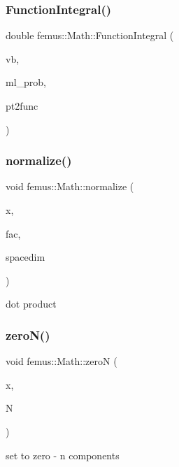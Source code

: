 \subsubsection{\texorpdfstring{Function\+Integral()}{FunctionIntegral()}}
{\footnotesize\ttfamily double femus\+::\+Math\+::\+Function\+Integral (\begin{DoxyParamCaption}\item[{const \mbox{\hyperlink{_typedefs_8hpp_a91ad9478d81a7aaf2593e8d9c3d06a14}{uint}}}]{vb,  }\item[{\mbox{\hyperlink{classfemus_1_1_multi_level_problem}{Multi\+Level\+Problem}} \&}]{ml\+\_\+prob,  }\item[{double($\ast$)(double, const std\+::vector$<$ double $>$)}]{pt2func }\end{DoxyParamCaption})\hspace{0.3cm}{\ttfamily [inline]}}

\mbox{\label{namespacefemus_1_1_math_a3c615988fe381fae399525c16a2941c5}} 
\subsubsection{\texorpdfstring{normalize()}{normalize()}}
{\footnotesize\ttfamily void femus\+::\+Math\+::normalize (\begin{DoxyParamCaption}\item[{double $\ast$}]{x,  }\item[{const double}]{fac,  }\item[{const \mbox{\hyperlink{_typedefs_8hpp_a91ad9478d81a7aaf2593e8d9c3d06a14}{uint}}}]{spacedim }\end{DoxyParamCaption})\hspace{0.3cm}{\ttfamily [inline]}}



dot product 

\mbox{\label{namespacefemus_1_1_math_a1ac507af12e3ceaf078b640984b82059}} 
\subsubsection{\texorpdfstring{zero\+N()}{zeroN()}}
{\footnotesize\ttfamily void femus\+::\+Math\+::zeroN (\begin{DoxyParamCaption}\item[{double $\ast$}]{x,  }\item[{const \mbox{\hyperlink{_typedefs_8hpp_a91ad9478d81a7aaf2593e8d9c3d06a14}{uint}}}]{N }\end{DoxyParamCaption})\hspace{0.3cm}{\ttfamily [inline]}}



set to zero -\/ n components 

